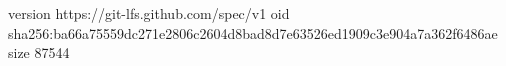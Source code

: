 version https://git-lfs.github.com/spec/v1
oid sha256:ba66a75559dc271e2806c2604d8bad8d7e63526ed1909c3e904a7a362f6486ae
size 87544
